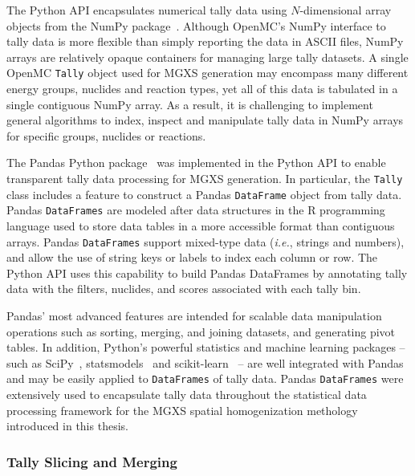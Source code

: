 The Python API encapsulates numerical tally data using $N$-dimensional array objects from the NumPy package~\cite{walt2011numpy}. Although OpenMC's NumPy interface to tally data is more flexible than simply reporting the data in \ac{ASCII} files, NumPy arrays are relatively opaque containers for managing large tally datasets. A single OpenMC \texttt{Tally} object used for \ac{MGXS} generation may encompass many different energy groups, nuclides and reaction types, yet all of this data is tabulated in a single contiguous NumPy array. As a result, it is challenging to implement general algorithms to index, inspect and manipulate tally data in NumPy arrays for specific groups, nuclides or reactions.

The Pandas Python package~\cite{mckinney2010pandas} was implemented in the Python \ac{API} to enable transparent tally data processing for \ac{MGXS} generation. In particular, the \texttt{Tally} class includes a feature to construct a Pandas 
\texttt{DataFrame} object from tally data. Pandas \texttt{DataFrames} are modeled after data structures in the \textsf{R} programming language used to store data tables in a more accessible format than contiguous arrays. Pandas \texttt{DataFrames} support mixed-type data (\textit{i.e.}, strings and numbers), and allow the use of string keys or labels to index each column or row. The Python \ac{API} uses this capability to build Pandas DataFrames by annotating tally data with the filters, nuclides, and scores associated with each tally bin. 

Pandas' most advanced features are intended for scalable data manipulation operations such as sorting, merging, and joining datasets, and generating pivot tables. In addition, Python's powerful statistics and machine learning packages -- such as SciPy~\cite{jones2011scipy}, statsmodels~\cite{seabold2010statsmodels} and scikit-learn~\cite{pedregosa2011sklearn} -- are well integrated with Pandas and may be easily applied to \texttt{DataFrames} of tally data. Pandas \texttt{DataFrames} were extensively used to encapsulate tally data throughout the statistical data processing framework for the \ac{MGXS} spatial homogenization methology introduced in this thesis.

\subsubsection{Tally Slicing and Merging}
\label{sec:chap3-tally-slice-merge}

